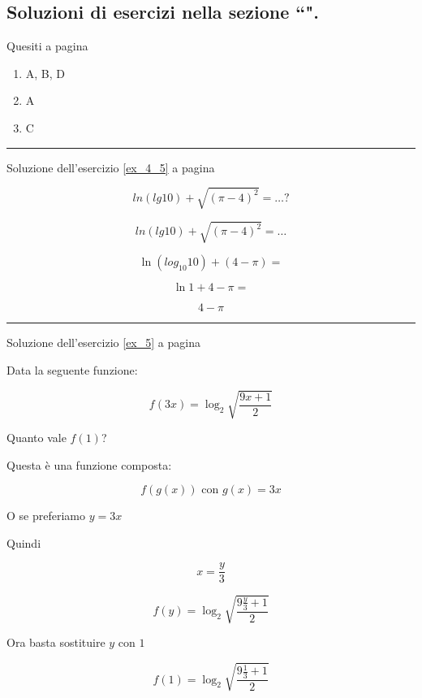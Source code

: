 \subsection{Soluzioni di esercizi nella sezione ``\textbf{}".}

Quesiti a pagina \pageref{ex_mc}
\label{sol_mc}

\begin{enumerate}
\item A, B, D
\item A
\item C
\end{enumerate}

\vspace{1cm}
\hrule
\vspace{1cm}

Soluzione dell'esercizio \ref{ex_4_5} a pagina \pageref{ex_4_5}\label{sol_4_5}

\[ %
ln(lg 10)+ \sqrt{(\pi -4)^2}=\ldots?
\]


\[
ln(lg 10)+ \sqrt{(\pi -4)^2}=\ldots
\]

\[
\ln(log_{10} 10) +(4-\pi)=
\]

\[
\ln1+4-\pi=
\]

\[
4-\pi
\]





\vspace{1cm}
\hrule
\vspace{1cm}






Soluzione dell'esercizio \ref{ex_5} a pagina \pageref{ex_5}\label{sol_5}

Data la seguente funzione:

\[
f(3x)=\log_2{\sqrt{\frac{9x+1}{2}}}
\]

Quanto vale $f(1)$?


Questa è una funzione composta:

\[
f(g(x)) \textrm{ con } g(x)=3x
\]

O se preferiamo $y=3x$

Quindi 

\[
x=\frac{y}{3}
\]

\[
f(y)=\log_2{\sqrt{\frac{9\frac{y}{3}+1}{2}}}
\]

Ora basta sostituire $y$ con $1$

\[
f(1)=\log_2{\sqrt{\frac{9\frac{1}{3}+1}{2}}}
\]



